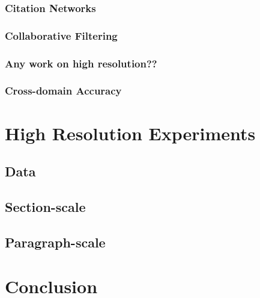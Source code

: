 \documentclass[sigconf]{acmart}
\begin{document}
\subsubsection{Citation Networks}

\subsubsection{Collaborative Filtering}

\subsubsection{Any work on high resolution??}

\subsubsection{Cross-domain Accuracy}

\section{High Resolution Experiments}

\subsection{Data}

\subsection{Section-scale}

\subsection{Paragraph-scale}

\section{Conclusion}



\end{document}

